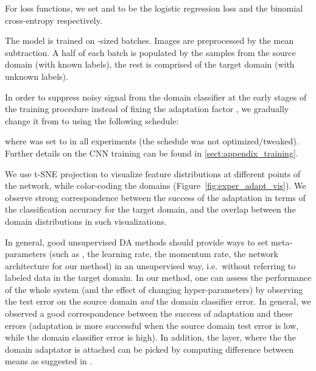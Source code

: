 \documentclass{article}
\newcommand{\fig}[1]{Figure~\ref{fig:#1}}
\begin{document}
For loss functions, we set  and  to be the logistic regression loss and the binomial cross-entropy respectively.

\vspace{2mm}
The model is trained on -sized batches. Images are preprocessed by the mean subtraction. A half of each batch is populated by the samples from the source domain (with known labels), the rest is comprised of the target domain (with unknown labels).

In order to suppress noisy signal from the domain classifier at the early stages of the training procedure instead of fixing the adaptation factor , we gradually change it from  to  using the following schedule:

where  was set to  in all experiments (the schedule was not optimized/tweaked). Further details on the CNN training can be found in \ref{sect:appendix_training}.

\vspace{2mm}
We use t-SNE \cite{Maaten13} projection to visualize feature distributions at different points of the network, while color-coding the domains (\fig{exper_adapt_vis}). We observe strong correspondence between the success of the adaptation in terms of the classification accuracy for the target domain, and the overlap between the domain distributions in such visualizations.
 
\vspace{2mm} 
In general, good unsupervised DA methods should provide ways to set meta-parameters (such as , the learning rate, the momentum rate, the network architecture for our method) in an unsupervised way, i.e.\ without referring to labeled data in the target domain. In our method, one can assess the performance of the whole system (and the effect of changing hyper-parameters) by observing the test error on the source domain {\em and} the domain classifier error. In general, we observed a good correspondence between the success of adaptation and these errors (adaptation is more successful when the source domain test error is low, while the domain classifier error is high).
In addition, the layer, where the the domain adaptator is attached can be picked by computing difference between means as suggested in \cite{Tzeng14}. 
\end{document}
